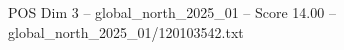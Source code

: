 \begin{textsample}{POS Dim 3 – global\_north\_2025\_01 – Score 14.00 – global\_north\_2025\_01/120103542.txt}
\end{textsample}
